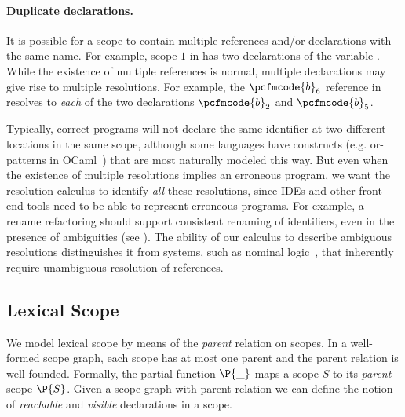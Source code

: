 \paragraph{Duplicate declarations.}

It is possible for a scope to contain multiple references and/or
declarations with the same name.
For example, scope $1$ in  has two declarations of the
variable .
While the existence of multiple references is normal, multiple
declarations may give rise to multiple resolutions.
For example, the $\pcfmcode{b}_6$ reference in 
resolves to \emph{each} of the two declarations $\pcfmcode{b}_2$ and
$\pcfmcode{b}_5$.  

Typically, correct programs will not declare the same identifier
at two different locations in the same scope,
although some languages have constructs (e.g. or-patterns in OCaml~\cite{ocamlrefman}) that are most
naturally modeled this way. 
But even when the existence of multiple resolutions implies an erroneous program, 
we want the resolution
calculus to identify \emph{all} these resolutions, since IDEs and other
front-end tools need to be able to represent erroneous programs.
For example, a rename refactoring should support consistent renaming of identifiers, even in
the presence of ambiguities (see ).
The ability of our calculus to describe ambiguous resolutions distinguishes it
from systems, such as nominal logic~\cite{Cheney05a}, that inherently require unambiguous resolution of references. 

\vspace*{-0.5\baselineskip}

\subsection{Lexical Scope}

We model lexical scope by means of the \emph{parent} relation on scopes.
In a well-formed scope graph, each scope has at most one parent and the parent
relation is well-founded.
Formally, the partial function $\P{\_}$ maps a scope $S$ to its \emph{parent}
scope $\P{S}$.
Given a scope graph with parent relation we can define the notion of
\emph{reachable} and \emph{visible} declarations in a scope.

